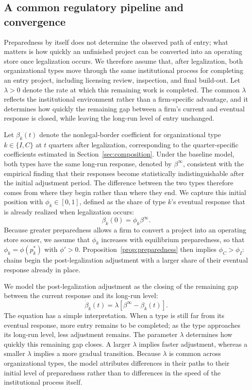 \documentclass[english,12pt]{article}
\begin{document}
\subsection{A common regulatory pipeline and convergence}
\label{sec:diffusion}
Preparedness by itself does not determine the observed path of entry; what matters is how quickly an unfinished project can be converted into an operating store once legalization occurs. We therefore assume that, after legalization, both organizational types move through the same institutional process for completing an entry project, including licensing review, inspection, and final build-out. Let $\lambda>0$ denote the rate at which this remaining work is completed. The common $\lambda$ reflects the institutional environment rather than a firm-specific advantage, and it determines how quickly the remaining gap between a firm's current and eventual response is closed, while leaving the long-run level of entry unchanged.

Let $\beta_k(t)$ denote the nonlegal-border coefficient for organizational type $k\in\{I,C\}$ at $t$ quarters after legalization, corresponding to the quarter-specific coefficients estimated in Section~\ref{sec:composition}. Under the baseline model, both types have the same long-run response, denoted by $\beta^\infty$, consistent with the empirical finding that their responses become statistically indistinguishable after the initial adjustment period. The difference between the two types therefore comes from where they begin rather than where they end. We capture this initial position with $\phi_k\in[0,1]$, defined as the share of type $k$'s eventual response that is already realized when legalization occurs:
\[
\beta_k(0)=\phi_k\beta^\infty.
\]
Because greater preparedness allows a firm to convert a project into an operating store sooner, we assume that $\phi_k$ increases with equilibrium preparedness, so that $\phi_k=\phi(p_k^*)$ with $\phi'>0$. Proposition~\ref{prop:preparedness} then implies $\phi_C>\phi_I$: chains begin the post-legalization adjustment with a larger share of their eventual response already in place.

We model the post-legalization adjustment as the closing of the remaining gap between the current response and its long-run level:
\begin{equation}
\label{eq:betadot}
\dot{\beta}_k(t)
=
\lambda
\left[
\beta^\infty-\beta_k(t)
\right].
\end{equation}
The equation has a simple interpretation. When a type is still far from its eventual response, more entry remains to be completed; as the type approaches its long-run level, less adjustment remains. The parameter $\lambda$ determines how quickly this remaining gap closes. A larger $\lambda$ implies faster adjustment, whereas a smaller $\lambda$ implies a more gradual transition. Because $\lambda$ is common across organizational types, the model attributes differences in their paths to their initial level of preparedness rather than to differences in the speed of the institutional process itself.
\end{document}
